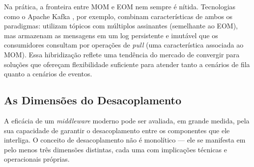 \documentclass[12pt, a4paper]{article}
\begin{document}
Na prática, a fronteira entre MOM e EOM nem sempre é nítida. Tecnologias como o Apache Kafka \cite{alaasam2019}, por exemplo, combinam características de ambos os paradigmas: utilizam tópicos com múltiplos assinantes (semelhante ao EOM), mas armazenam as mensagens em um log persistente e imutável que os consumidores consultam por operações de \textit{pull} (uma característica associada ao MOM). Essa hibridização reflete uma tendência do mercado de convergir para soluções que ofereçam flexibilidade suficiente para atender tanto a cenários de fila quanto a cenários de eventos.


\subsection{As Dimensões do Desacoplamento}

A eficácia de um \textit{middleware} moderno pode ser avaliada, em grande medida, pela sua capacidade de garantir o desacoplamento entre os componentes que ele interliga. O conceito de desacoplamento não é monolítico --- ele se manifesta em pelo menos três dimensões distintas, cada uma com implicações técnicas e operacionais próprias.
\end{document}

